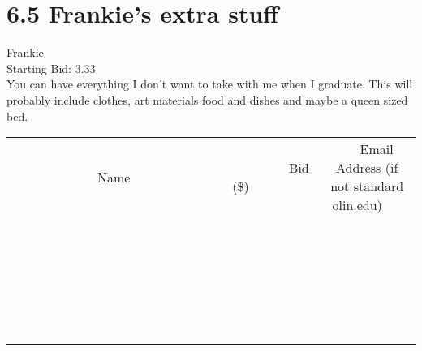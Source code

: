 \documentclass[11pt]{article}
\begin{document}
					\section*{6.5 Frankie's extra stuff}
					Frankie \\
					Starting Bid: 3.33 \\
					You can have everything I don't want to take with me when I graduate. This will probably include clothes, art materials food and dishes and maybe a queen sized bed. \\
					[6ex]
					\begin{tabular}{c c c}
						~~~~~~~~~~~~~Name~~~~~~~~~~~~~ & ~~~~~~~~~Bid (\$)~~~~~~~~~ & ~~~Email Address (if not standard olin.edu)~~~ \\
				
 & & \\
\hline
 & & \\
\hline
 & & \\
\hline
 & & \\
\hline
 & & \\
\hline
 & & \\
\hline
 & & \\
\hline
 & & \\
\hline
 & & \\
\hline
 & & \\
\hline
 & & \\
\hline
 & & \\
\hline
 & & \\
\hline
 & & \\
\hline
 & & \\
\hline
 & & \\
\hline
 & & \\
\hline
 & & \\
\hline
 & & \\
\hline
 & & \\
\hline
 & & \\
\hline
 & & \\
\hline
 & & \\
\hline
 & & \\
\hline
 & & \\
\hline
 & & \\
\hline
					\end{tabular}
					\clearpage
				
\end{document}
